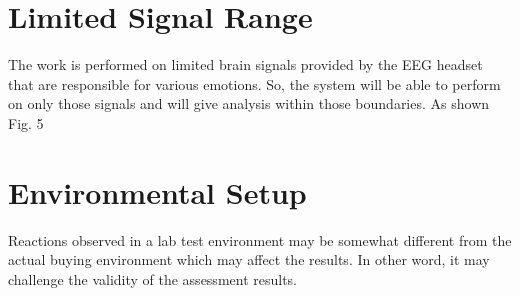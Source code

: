 \documentclass[a4paper, 12pt, oneside]{uet_thesis}
\begin{document}
\section{Limited Signal Range}

The work is performed on limited brain signals provided by the EEG headset that are responsible for various emotions. So, the system will be able to perform on only those signals and will give analysis within those boundaries. As shown Fig. 5

\section{Environmental Setup}
Reactions observed in a lab test environment may be somewhat different from the actual buying environment which may affect the results. In other word, it may challenge the validity of the assessment results.








\backmatter

\newpage
\end{document}
